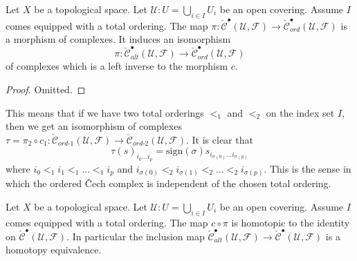 \begin{lemma}
\label{lemma-project-to-ordered}
Let $X$ be a topological space.
Let $\mathcal{U} : U = \bigcup_{i \in I} U_i$ be an open covering.
Assume $I$ comes equipped with a total ordering.
The map $\pi : \check{\mathcal{C}}^\bullet(\mathcal{U}, \mathcal{F})
\to \check{\mathcal{C}}_{ord}^\bullet(\mathcal{U}, \mathcal{F})$
is a morphism of complexes. It induces an isomorphism
$$
\pi : \check{\mathcal{C}}_{alt}^\bullet(\mathcal{U}, \mathcal{F})
\to \check{\mathcal{C}}_{ord}^\bullet(\mathcal{U}, \mathcal{F})
$$
of complexes which is a left inverse to the morphism $c$.
\end{lemma}

\begin{proof}
Omitted.
\end{proof}

\begin{remark}
\label{remark-compared-ordered-complexes}
This means that if we have two total orderings $<_1$ and $<_2$ on
the index set $I$, then we get an isomorphism of complexes
$\tau = \pi_2 \circ c_1 :
\check{\mathcal{C}}_{ord\text{-}1}(\mathcal{U}, \mathcal{F}) \to
\check{\mathcal{C}}_{ord\text{-}2}(\mathcal{U}, \mathcal{F})$.
It is clear that
$$
\tau(s)_{i_0 \ldots i_p} =
\text{sign}(\sigma) s_{i_{\sigma(0)} \ldots i_{\sigma(p)}}
$$
where $i_0 <_1 i_1 <_1 \ldots <_1 i_p$ and
$i_{\sigma(0)} <_2 i_{\sigma(1)} <_2 \ldots <_2 i_{\sigma(p)}$.
This is the sense in which the ordered {\v C}ech complex is independent
of the chosen total ordering.
\end{remark}

\begin{lemma}
\label{lemma-alternating-usual}
Let $X$ be a topological space.
Let $\mathcal{U} : U = \bigcup_{i \in I} U_i$ be an open covering.
Assume $I$ comes equipped with a total ordering.
The map $c \circ \pi$ is homotopic to the identity on
$\check{\mathcal{C}}^\bullet(\mathcal{U}, \mathcal{F})$.
In particular the inclusion map
$\check{\mathcal{C}}_{alt}^\bullet(\mathcal{U}, \mathcal{F}) \to
\check{\mathcal{C}}^\bullet(\mathcal{U}, \mathcal{F})$
is a homotopy equivalence.
\end{lemma}

